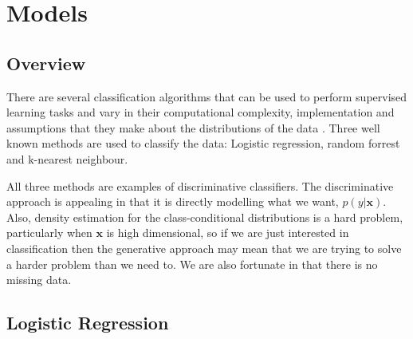 
\chapter{Models}

\section{Overview}
There are several classification algorithms that can be used to perform supervised learning tasks and vary in their computational complexity, implementation and assumptions that they make about the distributions of the data \cite{Beckel3}. Three well known methods are used to classify the data: Logistic regression, random forrest and k-nearest neighbour.

All three methods are examples of discriminative classifiers. The discriminative approach is appealing in that it is directly modelling what we want, $p(y|\textbf{x})$. Also, density estimation for the class-conditional distributions is a hard problem, particularly when $\textbf{x}$ is high dimensional, so if we are just interested in classification then the generative approach may mean that we are trying to solve a harder problem than we need to\cite{Williams}. We are also fortunate in that there is no missing data. 

\section{Logistic Regression}
%
%
%
%

